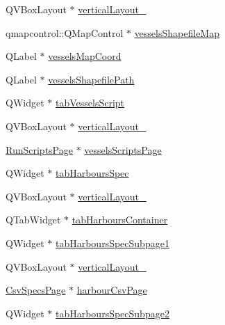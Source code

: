 \begin{DoxyCompactItemize}
\item 
Q\+V\+Box\+Layout $\ast$ \mbox{\hyperlink{class_ui___vessel_editor_main_window_acb9caa471b25bef478a58a8ce61c974d}{vertical\+Layout\+\_}}
\item 
qmapcontrol\+::\+Q\+Map\+Control $\ast$ \mbox{\hyperlink{class_ui___vessel_editor_main_window_a79902125d8f2f7fbb1d991f8a93e5f98}{vessels\+Shapefile\+Map}}
\item 
Q\+Label $\ast$ \mbox{\hyperlink{class_ui___vessel_editor_main_window_abe12245bb610c2d6da56327f31312c8a}{vessels\+Map\+Coord}}
\item 
Q\+Label $\ast$ \mbox{\hyperlink{class_ui___vessel_editor_main_window_a6a931ffe4289fc5adf893b19776523a7}{vessels\+Shapefile\+Path}}
\item 
Q\+Widget $\ast$ \mbox{\hyperlink{class_ui___vessel_editor_main_window_a7edc261e9122058734e227e959d31975}{tab\+Vessels\+Script}}
\item 
Q\+V\+Box\+Layout $\ast$ \mbox{\hyperlink{class_ui___vessel_editor_main_window_abdaa49f3f9730cd99015e56c3920bfbf}{vertical\+Layout\+\_}}
\item 
\mbox{\hyperlink{class_run_scripts_page}{Run\+Scripts\+Page}} $\ast$ \mbox{\hyperlink{class_ui___vessel_editor_main_window_a2b83c7e99654f5b8923f0f8f05f008c7}{vessels\+Scripts\+Page}}
\item 
Q\+Widget $\ast$ \mbox{\hyperlink{class_ui___vessel_editor_main_window_af8554381632ebc2b878112ba84a0bdfc}{tab\+Harbours\+Spec}}
\item 
Q\+V\+Box\+Layout $\ast$ \mbox{\hyperlink{class_ui___vessel_editor_main_window_a0bb96ab3098855974b61aa883d3a993b}{vertical\+Layout\+\_}}
\item 
Q\+Tab\+Widget $\ast$ \mbox{\hyperlink{class_ui___vessel_editor_main_window_a9176ebe5774b7a038d08cf5d3515e98d}{tab\+Harbours\+Container}}
\item 
Q\+Widget $\ast$ \mbox{\hyperlink{class_ui___vessel_editor_main_window_a42772a953d6fbe81bf47dade07dad558}{tab\+Harbours\+Spec\+Subpage1}}
\item 
Q\+V\+Box\+Layout $\ast$ \mbox{\hyperlink{class_ui___vessel_editor_main_window_aae2b6bee3d0567a28b5faf294bd520bf}{vertical\+Layout\+\_}}
\item 
\mbox{\hyperlink{class_csv_specs_page}{Csv\+Specs\+Page}} $\ast$ \mbox{\hyperlink{class_ui___vessel_editor_main_window_a5216eaee6691bda02ff4f5974594bb96}{harbour\+Csv\+Page}}
\item 
Q\+Widget $\ast$ \mbox{\hyperlink{class_ui___vessel_editor_main_window_a4e3ff120df1209f9719bf55b483459a7}{tab\+Harbours\+Spec\+Subpage2}}

\end{DoxyCompactItemize}
